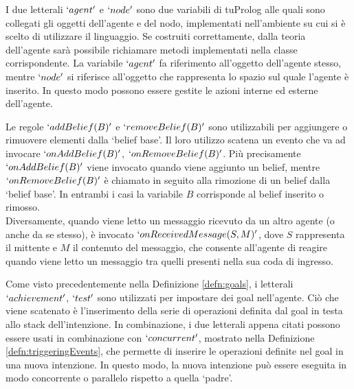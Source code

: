\medskip
I due letterali $`agent'$ e $`node'$ sono due variabili di tuProlog alle quali sono collegati gli oggetti dell'agente e del nodo, implementati nell'ambiente su cui si è scelto di utilizzare il linguaggio. Se costruiti correttamente, dalla teoria dell'agente sarà possibile richiamare metodi implementati nella classe corrispondente. La variabile $`agent'$ fa riferimento all'oggetto dell'agente stesso, mentre $`node'$ si riferisce all'oggetto che rappresenta lo spazio sul quale l'agente è inserito. In questo modo possono essere gestite le azioni interne ed esterne dell'agente.

\medskip
Le regole $`addBelief(B)'$ e $`removeBelief(B)'$ sono utilizzabili per aggiungere o rimuovere elementi dalla `belief base'. Il loro utilizzo scatena un evento che va ad invocare $`onAddBelief(B)'$, $`onRemoveBelief(B)'$. Più precisamente $`onAddBelief(B)'$ viene invocato quando viene aggiunto un belief, mentre $`onRemoveBelief(B)'$ è chiamato in seguito alla rimozione di un belief dalla `belief base'. In entrambi i casi la variabile $B$ corrisponde al belief inserito o rimosso.
\\
Diversamente, quando viene letto un messaggio ricevuto da un altro agente (o anche da se stesso), è invocato $`onReceivedMessage(S, M)'$, dove $S$ rappresenta il mittente e $M$ il contenuto del messaggio, che consente all'agente di reagire quando viene letto un messaggio tra quelli presenti nella sua coda di ingresso.

\medskip
Come visto precedentemente nella Definizione \ref{defn:goals}, i letterali $`achievement'$, $`test'$ sono utilizzati per impostare dei goal nell'agente. Ciò che viene scatenato è l'inserimento della serie di operazioni definita dal goal in testa allo stack dell'intenzione.
In combinazione, i due letterali appena citati possono essere usati in combinazione con $`concurrent'$, mostrato nella Definizione \ref{defn:triggeringEvents}, che permette di inserire le operazioni definite nel goal in una nuova intenzione. In questo modo, la nuova intenzione può essere eseguita in modo concorrente o parallelo rispetto a quella `padre'.

